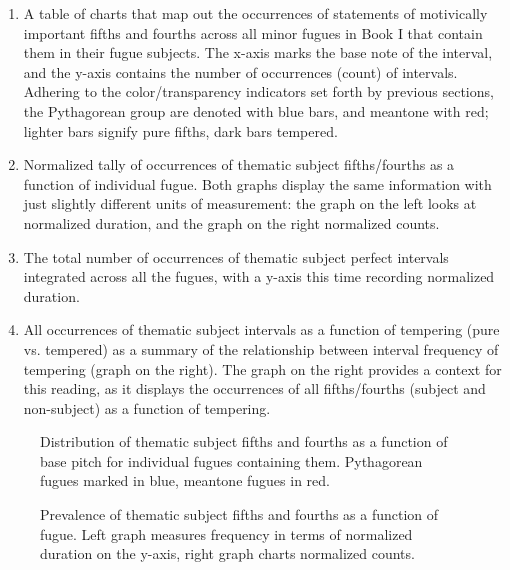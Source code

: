 \begin{enumerate}
\def\labelenumi{\arabic{enumi}.}
\tightlist
\item
  A table of charts that map out the occurrences of statements of
  motivically important fifths and fourths across all minor fugues in
  Book I that contain them in their fugue subjects. The x-axis marks the
  base note of the interval, and the y-axis contains the number of
  occurrences (count) of intervals. Adhering to the color/transparency
  indicators set forth by previous sections, the Pythagorean group are
  denoted with blue bars, and meantone with red; lighter bars signify
  pure fifths, dark bars tempered.
\item
  Normalized tally of occurrences of thematic subject fifths/fourths as
  a function of individual fugue. Both graphs display the same
  information with just slightly different units of measurement: the
  graph on the left looks at normalized duration, and the graph on the
  right normalized counts.
\item
  The total number of occurrences of thematic subject perfect intervals
  integrated across all the fugues, with a y-axis this time recording
  normalized duration.
\item
  All occurrences of thematic subject intervals as a function of
  tempering (pure vs. tempered) as a summary of the relationship between
  interval frequency of tempering (graph on the right). The graph on the
  right provides a context for this reading, as it displays the
  occurrences of all fifths/fourths (subject and non-subject) as a
  function of tempering.
\end{enumerate}



\begin{figure}[H]
\vspace{1.5em}
    \centering
    \caption[Distribution of thematic subject fifths and fourths as a function of base pitch for individual fugues. ]{Distribution of thematic subject fifths and fourths as a function of base pitch for individual fugues containing them. Pythagorean fugues marked in blue, meantone fugues in red.}
\end{figure}

\begin{figure}[H]
\vspace{1.5em}
    \centering
    \caption[Prevalence of thematic subject fifths and fourths as a function of fugue. ]{Prevalence of thematic subject fifths and fourths as a function of fugue. Left graph measures frequency in terms of normalized duration on the y-axis, right graph charts normalized counts.}
\end{figure}


